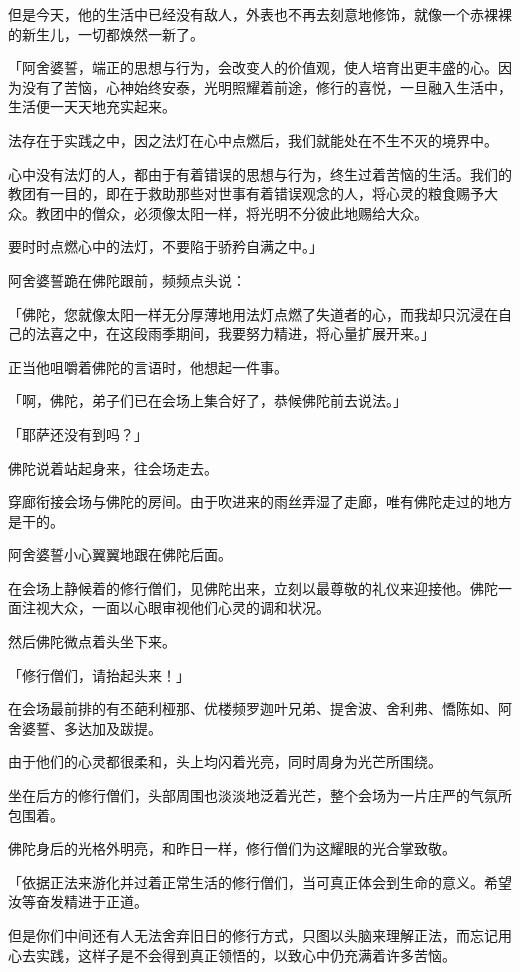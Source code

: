 \documentclass[twoside,openany]{book}
\begin{document}
但是今天，他的生活中已经没有敌人，外表也不再去刻意地修饰，就像一个赤裸裸的新生儿，一切都焕然一新了。

「阿舍婆誓，端正的思想与行为，会改变人的价值观，使人培育出更丰盛的心。因为没有了苦恼，心神始终安泰，光明照耀着前途，修行的喜悦，一旦融入生活中，生活便一天天地充实起来。

法存在于实践之中，因之法灯在心中点燃后，我们就能处在不生不灭的境界中。

心中没有法灯的人，都由于有着错误的思想与行为，终生过着苦恼的生活。我们的教团有一目的，即在于救助那些对世事有着错误观念的人，将心灵的粮食赐予大众。教团中的僧众，必须像太阳一样，将光明不分彼此地赐给大众。

要时时点燃心中的法灯，不要陷于骄矜自满之中。」

阿舍婆誓跪在佛陀跟前，频频点头说：

「佛陀，您就像太阳一样无分厚薄地用法灯点燃了失道者的心，而我却只沉浸在自己的法喜之中，在这段雨季期间，我要努力精进，将心量扩展开来。」

正当他咀嚼着佛陀的言语时，他想起一件事。

「啊，佛陀，弟子们已在会场上集合好了，恭候佛陀前去说法。」

「耶萨还没有到吗？」

佛陀说着站起身来，往会场走去。

穿廊衔接会场与佛陀的房间。由于吹进来的雨丝弄湿了走廊，唯有佛陀走过的地方是干的。

阿舍婆誓小心翼翼地跟在佛陀后面。

在会场上静候着的修行僧们，见佛陀出来，立刻以最尊敬的礼仪来迎接他。佛陀一面注视大众，一面以心眼审视他们心灵的调和状况。

然后佛陀微点着头坐下来。

「修行僧们，请抬起头来！」

在会场最前排的有丕葩利桠那、优楼频罗迦叶兄弟、提舍波、舍利弗、憍陈如、阿舍婆誓、多达加及跋提。

由于他们的心灵都很柔和，头上均闪着光亮，同时周身为光芒所围绕。

坐在后方的修行僧们，头部周围也淡淡地泛着光芒，整个会场为一片庄严的气氛所包围着。

佛陀身后的光格外明亮，和昨日一样，修行僧们为这耀眼的光合掌致敬。

「依据正法来游化并过着正常生活的修行僧们，当可真正体会到生命的意义。希望汝等奋发精进于正道。

但是你们中间还有人无法舍弃旧日的修行方式，只图以头脑来理解正法，而忘记用心去实践，这样子是不会得到真正领悟的，以致心中仍充满着许多苦恼。
\end{document}
